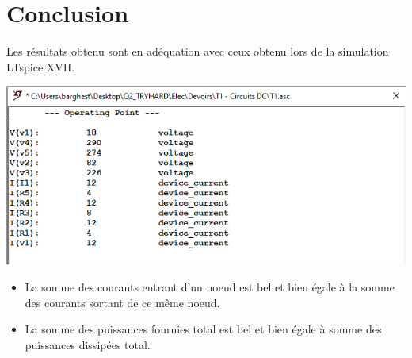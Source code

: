\documentclass{homeworg}
\begin{document}
\section{Conclusion}
    Les résultats obtenu sont en adéquation avec ceux obtenu lors de la simulation LTspice XVII.
    \begin{center}
        \includegraphics[scale=0.75]{Results.PNG}
    \end{center}
    \begin{itemize}
        \item La somme des courants entrant d'un noeud est bel et bien égale à la somme des courants sortant de ce même noeud.
        \item La somme des puissances fournies total est bel et bien égale à somme des puissances dissipées total.
    \end{itemize}
\end{document}
